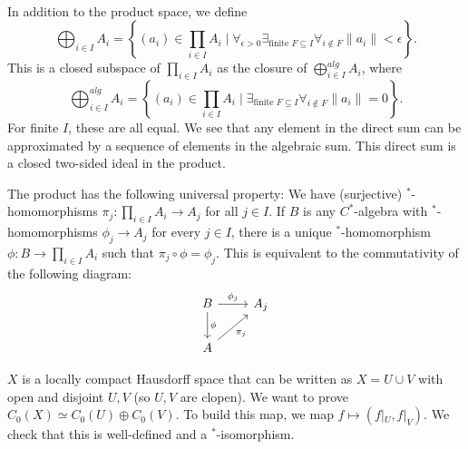 \documentclass[a4paper]{article}
\begin{document}
\begin{remark}~\\
	In addition to the product space, we define
	\begin{equation*}
		\bigoplus_{i \in I} A_i = \left\{(a_i) \in \prod_{i \in I} A_i \mid \forall_{\epsilon > 0} \exists_{\text{finite }F \subseteq I} \forall_{i \notin F} \|a_i\| < \epsilon\right\}\text{.}
	\end{equation*}
	This is a closed subspace of $\prod_{i \in I} A_i$ as the closure of $\bigoplus_{i \in I}^{alg} A_i$, where
	\begin{equation*}
		\bigoplus_{i \in I}^{alg} A_i = \left\{(a_i) \in \prod_{i \in I} A_i \mid \exists_{\text{finite }F \subseteq I} \forall_{i \notin F} \|a_i\| = 0\right\}\text{.}
	\end{equation*}
	For finite $I$, these are all equal. We see that any element in the direct sum can be approximated by a sequence of elements in the algebraic sum. This direct sum is a closed two-sided ideal in the product.

	The product has the following universal property:
	We have (surjective) $^*$-homomorphisms $\pi_j:  \prod_{i \in I} A_i \to A_j$ for all $j \in I$.
	If $B$ is any $C^*$-algebra with $^*$-homomorphisms $\phi_j \to A_j$ for every $j \in I$, there is a unique $^*$-homomorphism $\phi: B \to \prod_{i \in I} A_i$ such that  $\pi_j \circ \phi = \phi_j$.
	This is equivalent to the commutativity of the following diagram:
	\begin{equation*}
		\begin{tikzcd}
			B \arrow{r}{\phi_j} \arrow{d}{\phi} & A_j\\
			A  \arrow[swap]{ur}{\pi_j}
		\end{tikzcd}
	\end{equation*}
\end{remark}

\begin{exercise}[1.5]
	$X$ is a locally compact Hausdorff space that can be written as $X = U \cup V$ with open and disjoint $U,V$ (so $U,V$ are clopen). We want to prove $C_0(X) \simeq C_0(U) \oplus C_0(V)$. To build this map, we map $f \mapsto (f|_U, f|_V)$. We check that this is well-defined and a $^*$-isomorphism.
\end{exercise}
\end{document}
